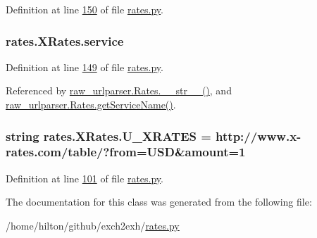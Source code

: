Definition at line \hyperlink{rates_8py_source_l00150}{150} of file \hyperlink{rates_8py_source}{rates.\+py}.

\subsubsection[{\texorpdfstring{service}{service}}]{\setlength{\rightskip}{0pt plus 5cm}rates.\+X\+Rates.\+service}\hypertarget{classrates_1_1_x_rates_ad80e3c0295deaa15fac085324716747f}{}\label{classrates_1_1_x_rates_ad80e3c0295deaa15fac085324716747f}


Definition at line \hyperlink{rates_8py_source_l00149}{149} of file \hyperlink{rates_8py_source}{rates.\+py}.



Referenced by \hyperlink{raw__urlparser_8py_source_l00038}{raw\+\_\+urlparser.\+Rates.\+\_\+\+\_\+str\+\_\+\+\_\+()}, and \hyperlink{raw__urlparser_8py_source_l00035}{raw\+\_\+urlparser.\+Rates.\+get\+Service\+Name()}.

\subsubsection[{\texorpdfstring{U\+\_\+\+X\+R\+A\+T\+ES}{U_XRATES}}]{\setlength{\rightskip}{0pt plus 5cm}string rates.\+X\+Rates.\+U\+\_\+\+X\+R\+A\+T\+ES = \textquotesingle{}http\+://www.\+x-\/rates.\+com/table/?from=U\+SD\&amount=1\textquotesingle{}\hspace{0.3cm}{\ttfamily [static]}}\hypertarget{classrates_1_1_x_rates_ab3bd64c08e6503f0d76c9f73dc38fa25}{}\label{classrates_1_1_x_rates_ab3bd64c08e6503f0d76c9f73dc38fa25}


Definition at line \hyperlink{rates_8py_source_l00101}{101} of file \hyperlink{rates_8py_source}{rates.\+py}.



The documentation for this class was generated from the following file\+:\begin{DoxyCompactItemize}
\item 
/home/hilton/github/exch2exh/\hyperlink{rates_8py}{rates.\+py}\end{DoxyCompactItemize}
